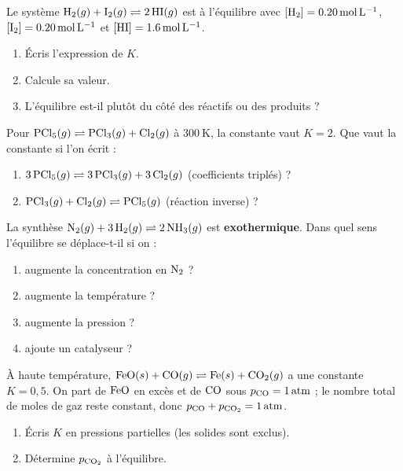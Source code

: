 \documentclass[11pt,a4paper]{article}
\begin{document}
\begin{exo}
Le système $\ce{H2}(g) + \ce{I2}(g) \rightleftharpoons 2\,\ce{HI}(g)$ est à l'équilibre avec $[\ce{H2}]=\qty{0.20}{\mol\per\litre}$, $[\ce{I2}]=\qty{0.20}{\mol\per\litre}$ et $[\ce{HI}]=\qty{1.6}{\mol\per\litre}$.
\begin{enumerate}[label=\alph*)]
  \item Écris l'expression de $K$.
  \item Calcule sa valeur.
  \item L'équilibre est-il plutôt du côté des réactifs ou des produits ?
\end{enumerate}
\end{exo}

\begin{exo}
Pour $\ce{PCl5}(g) \rightleftharpoons \ce{PCl3}(g) + \ce{Cl2}(g)$ à $\qty{300}{\kelvin}$, la constante vaut $K=2$. Que vaut la constante si l'on écrit :
\begin{enumerate}[label=\alph*)]
  \item $3\,\ce{PCl5}(g) \rightleftharpoons 3\,\ce{PCl3}(g) + 3\,\ce{Cl2}(g)$ (coefficients triplés) ?
  \item $\ce{PCl3}(g) + \ce{Cl2}(g) \rightleftharpoons \ce{PCl5}(g)$ (réaction inverse) ?
\end{enumerate}
\end{exo}

\begin{exo}
La synthèse $\ce{N2}(g) + 3\,\ce{H2}(g) \rightleftharpoons 2\,\ce{NH3}(g)$ est \textbf{exothermique}. Dans quel sens l'équilibre se déplace-t-il si on :
\begin{enumerate}[label=\alph*)]
  \item augmente la concentration en $\ce{N2}$ ?
  \item augmente la température ?
  \item augmente la pression ?
  \item ajoute un catalyseur ?
\end{enumerate}
\end{exo}

\begin{exo}
À haute température, $\ce{FeO}(s) + \ce{CO}(g) \rightleftharpoons \ce{Fe}(s) + \ce{CO2}(g)$ a une constante $K=0{,}5$. On part de $\ce{FeO}$ en excès et de $\ce{CO}$ sous $p_{\ce{CO}}=\qty{1}{atm}$ ; le nombre total de moles de gaz reste constant, donc $p_{\ce{CO}} + p_{\ce{CO2}} = \qty{1}{atm}$.
\begin{enumerate}[label=\alph*)]
  \item Écris $K$ en pressions partielles (les solides sont exclus).
  \item Détermine $p_{\ce{CO2}}$ à l'équilibre.
\end{enumerate}
\end{exo}
\end{document}
